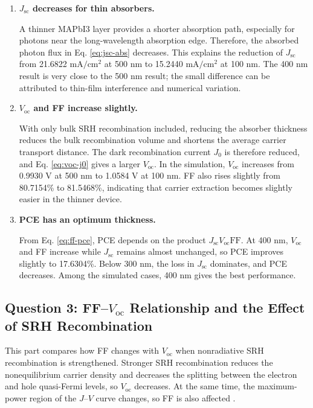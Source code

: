 \documentclass[12pt,a4paper,UTF8]{article}
\begin{document}
\begin{enumerate}[label=\textbf{\arabic*.}]
    \item \textbf{$J_\mathrm{sc}$ decreases for thin absorbers.}
    
    A thinner MAPbI3 layer provides a shorter absorption path, especially for photons near the long-wavelength absorption edge. Therefore, the absorbed photon flux in Eq. \eqref{eq:jsc-abs} decreases. This explains the reduction of $J_\mathrm{sc}$ from 21.6822 $\mathrm{mA/cm^2}$ at 500 nm to 15.2440 $\mathrm{mA/cm^2}$ at 100 nm. The 400 nm result is very close to the 500 nm result; the small difference can be attributed to thin-film interference and numerical variation.

    \item \textbf{$V_\mathrm{oc}$ and FF increase slightly.}
    
    With only bulk SRH recombination included, reducing the absorber thickness reduces the bulk recombination volume and shortens the average carrier transport distance. The dark recombination current $J_0$ is therefore reduced, and Eq. \eqref{eq:voc-j0} gives a larger $V_\mathrm{oc}$. In the simulation, $V_\mathrm{oc}$ increases from 0.9930 V at 500 nm to 1.0584 V at 100 nm. FF also rises slightly from 80.7154\% to 81.5468\%, indicating that carrier extraction becomes slightly easier in the thinner device.

    \item \textbf{PCE has an optimum thickness.}
    
    From Eq. \eqref{eq:ff-pce}, PCE depends on the product $J_\mathrm{sc}V_\mathrm{oc}\mathrm{FF}$. At 400 nm, $V_\mathrm{oc}$ and FF increase while $J_\mathrm{sc}$ remains almost unchanged, so PCE improves slightly to 17.6304\%. Below 300 nm, the loss in $J_\mathrm{sc}$ dominates, and PCE decreases. Among the simulated cases, 400 nm gives the best performance.
\end{enumerate}

\clearpage

\subsection{Question 3: FF--$V_\mathrm{oc}$ Relationship and the Effect of SRH Recombination}
This part compares how FF changes with $V_\mathrm{oc}$ when nonradiative SRH recombination is strengthened. Stronger SRH recombination reduces the nonequilibrium carrier density and decreases the splitting between the electron and hole quasi-Fermi levels, so $V_\mathrm{oc}$ decreases. At the same time, the maximum-power region of the $J$--$V$ curve changes, so FF is also affected \cite{tress2017}.
\end{document}
